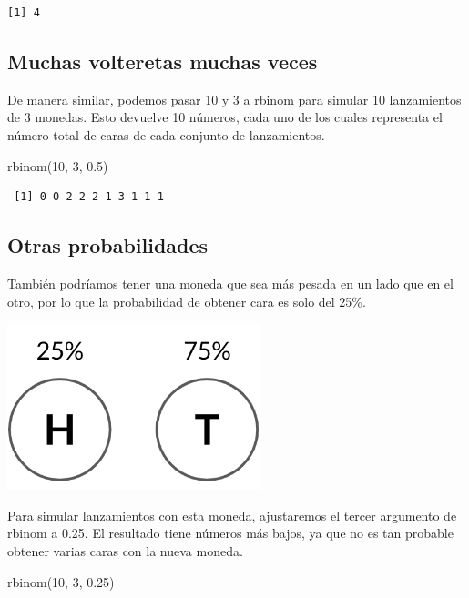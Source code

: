 \documentclass[
  letterpaper,
  DIV=11,
  numbers=noendperiod]{scrreprt}
\newenvironment{Shaded}{\begin{snugshade}}{\end{snugshade}}
\newcommand{\DecValTok}[1]{\textcolor[rgb]{0.68,0.00,0.00}{#1}}
\newcommand{\FloatTok}[1]{\textcolor[rgb]{0.68,0.00,0.00}{#1}}
\newcommand{\FunctionTok}[1]{\textcolor[rgb]{0.28,0.35,0.67}{#1}}
\newcommand{\NormalTok}[1]{\textcolor[rgb]{0.00,0.23,0.31}{#1}}
\begin{document}
\begin{verbatim}
[1] 4
\end{verbatim}

\hypertarget{muchas-volteretas-muchas-veces}{%
\subsection{Muchas volteretas muchas
veces}\label{muchas-volteretas-muchas-veces}}

De manera similar, podemos pasar 10 y 3 a rbinom para simular 10
lanzamientos de 3 monedas. Esto devuelve 10 números, cada uno de los
cuales representa el número total de caras de cada conjunto de
lanzamientos.

\begin{Shaded}
\begin{Highlighting}[]
\FunctionTok{rbinom}\NormalTok{(}\DecValTok{10}\NormalTok{, }\DecValTok{3}\NormalTok{, }\FloatTok{0.5}\NormalTok{)}
\end{Highlighting}
\end{Shaded}

\begin{verbatim}
 [1] 0 0 2 2 2 1 3 1 1 1
\end{verbatim}

\hypertarget{otras-probabilidades}{%
\subsection{Otras probabilidades}\label{otras-probabilidades}}

También podríamos tener una moneda que sea más pesada en un lado que en
el otro, por lo que la probabilidad de obtener cara es solo del 25\%.

\includegraphics{fig42.png}

Para simular lanzamientos con esta moneda, ajustaremos el tercer
argumento de rbinom a 0.25. El resultado tiene números más bajos, ya que
no es tan probable obtener varias caras con la nueva moneda.

\begin{Shaded}
\begin{Highlighting}[]
\FunctionTok{rbinom}\NormalTok{(}\DecValTok{10}\NormalTok{, }\DecValTok{3}\NormalTok{, }\FloatTok{0.25}\NormalTok{)}
\end{Highlighting}
\end{Shaded}
\end{document}
